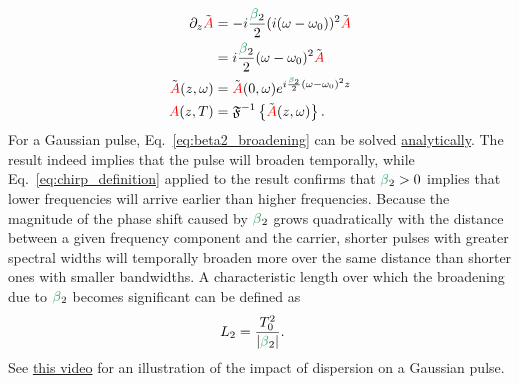 \begin{align}
    \label{eq:beta2_broadening}
    \partial_z \Tilde{\A} &= -i  \frac{\betag_2}{2} (i(\omega-\omega_0))^2 \Tilde{\A} \\ \nonumber
    &= i  \frac{\betag_2}{2}(\omega-\omega_0)^2\Tilde{\A} \\ \nonumber
    \Tilde{\A}(z,\omega)&=\Tilde{\A}(0,\omega)e^{i\frac{\betag_2}{2}(\omega-\omega_0)^2z} \\ \nonumber
    \A(z,T) &= \IFT\left\{  \Tilde{\A}(z,\omega)   \right\}.
\end{align}
For a Gaussian pulse, Eq.~\ref{eq:beta2_broadening} can be solved \href{https://drive.google.com/file/d/17Ab3bg0Hx0x8J-5lR29ejFg0eOlv6Psh/view?usp=sharing}{analytically}. The result indeed implies that the pulse will broaden temporally, while Eq.~\ref{eq:chirp_definition} applied to the result confirms that $\betag_2>0$ implies that lower frequencies will arrive earlier than higher frequencies. Because the magnitude of the phase shift caused by $\betag_2$ grows quadratically with the distance between a given frequency component and the carrier, shorter pulses with greater spectral widths will temporally broaden more over the same distance than shorter ones with smaller bandwidths. A characteristic length over which the broadening due to $\betag_2$ becomes significant can be defined as
\begin{align}
    \label{eq:Dispersion_length}
    L_{2} &= \frac{T_0^2}{|\betag_2|}.
\end{align}
See \href{https://www.youtube.com/watch?v=BP6Ra98AEuU}{this video} for an illustration of the impact of dispersion on a Gaussian pulse. 


